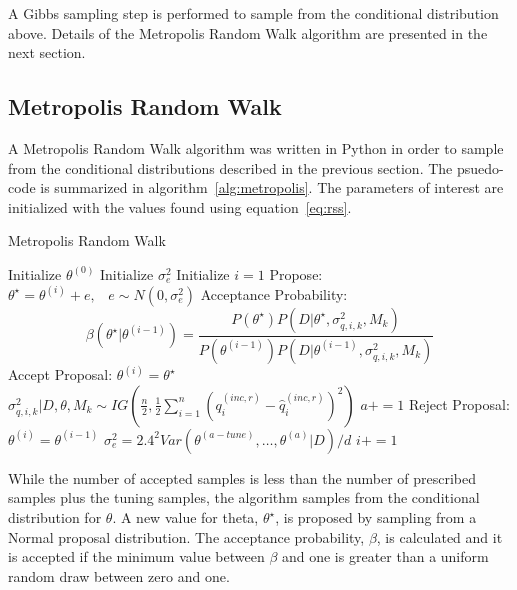 \documentclass[article]{proc}
\begin{document}
        \noindent A Gibbs sampling step is performed to sample from the conditional distribution above. Details of the Metropolis Random Walk algorithm are presented in the next section.

    \subsection{Metropolis Random Walk}

        A Metropolis Random Walk algorithm was written in Python in order to sample from the conditional distributions described in the previous section. The psuedo-code is summarized in algorithm~\ref{alg:metropolis}. The parameters of interest are initialized with the values found using equation~\ref{eq:rss}.   

        \begin{algorithm}
        \caption{Metropolis Random Walk}\label{alg:metropolis}
        \begin{algorithmic}[1]
        \State Initialize $\theta^{(0)}$
        \State Initialize $\sigma_e^2$
        \State Initialize $i = 1$
            \State Propose: $\theta^{\star} = \theta^{(i)} + e, \hspace{10pt} e \sim N(0, \sigma_e^2)$
            \State Acceptance Probability: $$\beta (\theta^{\star} | \theta^{(i-1)}) = \frac{P(\theta^{\star})P(D|\theta^{\star},\sigma_{q,i,k}^2,M_k)}{P(\theta^{(i-1)})P(D|\theta^{(i-1)},\sigma_{q,i,k}^2, M_k)}$$
                    \State Accept Proposal: $\theta^{(i)} = \theta^{\star}$
                    \State $\sigma_{q,i,k}^2 | D, \theta, M_k \sim IG \left(\frac{n}{2},  \frac{1}{2}\sum_{i=1}^n \left(q_i^{(inc,r)} - \hat{q}_i^{(inc,r)} \right)^2\right)$
                    \State $a+=1$
                \Else
                    \State Reject Proposal: $\theta^{(i)} = \theta^{(i-1)}$
                \EndIf
                \State $\sigma_e^2 = 2.4^2 Var(\theta^{(a-tune)}, \dots, \theta^{(a)}|D)/d$
            \EndWhile
            \State $i+=1$
        \EndWhile
        \end{algorithmic}
        \end{algorithm}

        While the number of accepted samples is less than the number of prescribed samples plus the tuning samples, the algorithm samples from the conditional distribution for $\theta$. A new value for theta, $\theta^{\star}$, is proposed by sampling from a Normal proposal distribution. The acceptance probability, $\beta$, is calculated and it is accepted if the minimum value between $\beta$ and one is greater than a uniform random draw between zero and one.
\end{document}
